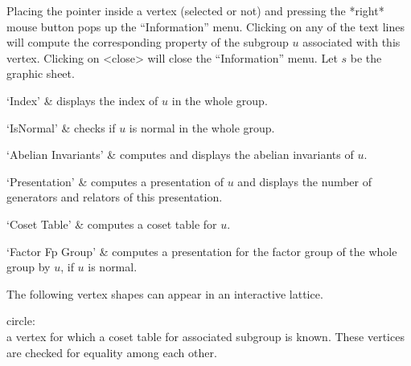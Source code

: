 %
%
%
%
%
%
%
%
%


Placing the pointer  inside a vertex (selected  or not) and  pressing the
*right* mouse button pops up the ``Information''  menu.  Clicking on any of
the text  lines will compute the corresponding   property of the subgroup
$u$  associated  with this  vertex. Clicking  on <close>  will  close the
``Information'' menu.  Let $s$ be the graphic sheet.

\beginitems
`Index' &
displays  the index of  $u$ in the whole  group.

`IsNormal' &
checks  if $u$ is  normal  in the  whole group.

`Abelian Invariants' &
computes  and  displays  the  abelian invariants  of  $u$.

`Presentation' &
computes a presentation of $u$ and displays  the number of generators and
relators   of   this presentation.

`Coset Table' &
computes   a   coset table for   $u$.

`Factor Fp Group' &
computes a presentation  for the factor group  of the whole group by $u$,
if $u$ is normal.
\enditems



The following vertex shapes can appear in an interactive lattice.

circle:\\
    a vertex for which  a coset table for  associated subgroup is  known.
    These vertices are checked for equality among each other.

